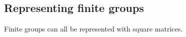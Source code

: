 
\subsection{Representing finite groups}

Finite groups can all be represented with square matrices.

